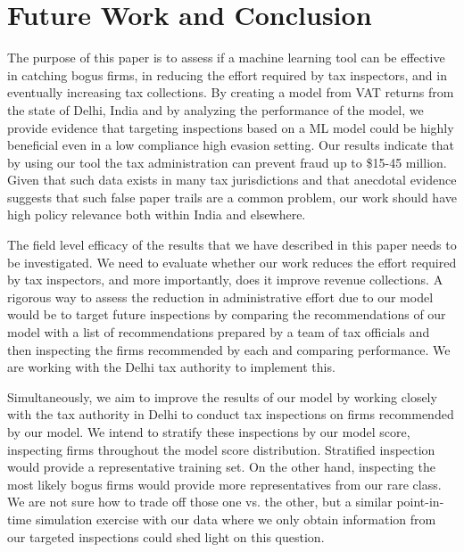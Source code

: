 \section{Future Work and Conclusion}
\label{sec:2-conclusion}
The purpose of this paper is to assess if a machine learning tool can be effective in catching bogus firms, in reducing the effort required by tax inspectors, and in eventually increasing tax collections. By creating a model from VAT returns from the state of Delhi, India and by analyzing the performance of the model, we provide evidence that targeting inspections based on a ML model could be highly beneficial even in a low compliance high evasion setting. Our results indicate that by using our tool the tax administration can prevent fraud up to \$15-45 million. Given that such data exists in many tax jurisdictions and that anecdotal evidence suggests that such false paper trails are a common problem, our work should have high policy relevance both within India and elsewhere.

The field level efficacy of the results that we have described in this paper needs to be investigated. We need to evaluate whether our work reduces the effort required by tax inspectors, and more importantly, does it improve revenue collections. A rigorous way to assess the reduction in administrative effort due to our model would be to target future inspections by comparing the recommendations of our model with a list of recommendations prepared by a team of tax officials and then inspecting the firms recommended by each and comparing performance. We are working with the Delhi tax authority to implement this.

Simultaneously, we aim to improve the results of our model by working closely with the tax authority in Delhi to conduct tax inspections on firms recommended by our model. We intend to stratify these inspections by our model score, inspecting firms throughout the model score distribution. Stratified inspection would provide a representative training set. On the other hand, inspecting the most likely bogus firms would provide more representatives from our rare class. We are not sure how to trade off those one vs. the other, but a similar point-in-time simulation exercise with our data where we only obtain information from our targeted inspections could shed light on this question.


